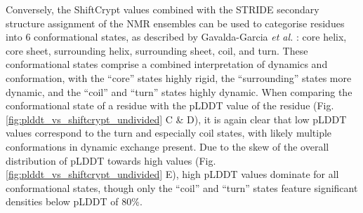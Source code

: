 Conversely, the ShiftCrypt values combined with the STRIDE \cite{frishman_knowledge-based_1995, lovell_structure_2003} secondary structure assignment of the NMR ensembles can be used to categorise residues into 6 conformational states, as described by Gavalda-Garcia \textit{et al.} \cite{gavalda-garcia_data-driven_2024}: core helix, core sheet, surrounding helix, surrounding sheet, coil, and turn. These conformational states comprise a combined interpretation of dynamics and conformation, with the ``core'' states highly rigid, the ``surrounding'' states more dynamic, and the ``coil'' and ``turn'' states highly dynamic. When comparing the conformational state of a residue with the pLDDT value of the residue (Fig. \ref{fig:plddt_vs_shiftcrypt_undivided} C \& D), it is again clear that low pLDDT values correspond to the turn and especially coil states, with likely multiple conformations in dynamic exchange present. Due to the skew of the overall distribution of pLDDT towards high values (Fig. \ref{fig:plddt_vs_shiftcrypt_undivided} E), high pLDDT values dominate for all conformational states, though only the ``coil'' and ``turn'' states feature significant densities below pLDDT of 80\%.

